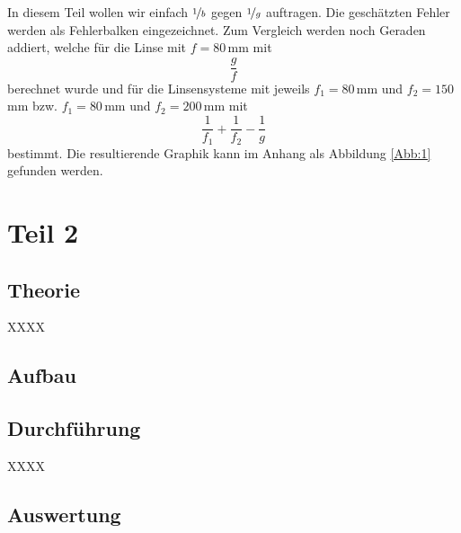 \documentclass[11pt,a4paper]{article}
\newcommand{\halftime}[4]{\begin{figure}[h]
\begin{minipage}{.#1\textwidth}#3\end{minipage}\begin{minipage}{.#2\textwidth}
\centering
#4\end{minipage}
\end{figure}}
\begin{document}
In diesem Teil wollen wir einfach $\nicefrac{1}{b}$ gegen $\nicefrac{1}{g}$ auftragen. Die gesch\"atzten Fehler werden als Fehlerbalken eingezeichnet. Zum Vergleich werden noch Geraden addiert, welche f\"ur die Linse mit $f=80\,$mm mit
\[
\frac{g}{f}
\]
berechnet wurde und f\"ur die Linsensysteme mit jeweils $f_1=80\,$mm und $f_2=150\,$mm bzw. $f_1=80\,$mm und $f_2=200\,$mm mit
\[
\frac{1}{f_1}+\frac{1}{f_2}-\frac{1}{g}
\]
bestimmt. Die resultierende Graphik kann im Anhang als Abbildung \ref{Abb:1} gefunden werden.

\section{Teil 2}

\subsection{Theorie}

XXXX

\subsection{Aufbau}



\subsection{Durchführung}

XXXX

\subsection{Auswertung}
\end{document}
